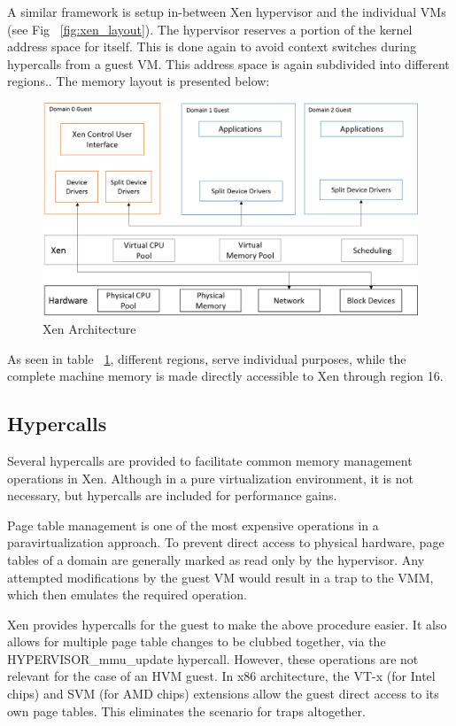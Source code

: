 A similar framework is setup in-between Xen hypervisor and the individual VMs (see Fig ~\ref{fig:xen_layout}). The hypervisor reserves a portion of the kernel address space for itself. This is done again to avoid context switches during hypercalls from a guest VM. This address space is again subdivided into different regions.. The memory layout is presented below: 



\begin{figure}
\centering
\includegraphics[scale=0.6]{figures/Xen_model.png}
\caption{Xen Architecture}
\label{tab:xen_address}
\end{figure}

As seen in table ~\ref{tab:xen_address}, different regions, serve individual purposes, while the complete machine memory is made directly accessible to Xen through region 16. 


\subsection{Hypercalls}
Several hypercalls are provided to facilitate common memory management operations in Xen. Although in a pure virtualization environment, it is not necessary, but hypercalls are included for performance gains.  

 

Page table management is one of the most expensive operations in a paravirtualization approach. To prevent direct access to physical hardware, page tables of a domain are generally marked as read only by the hypervisor. Any attempted modifications by the guest VM would result in a trap to the VMM, which then emulates the required operation. 


Xen provides hypercalls for the guest to make the above procedure easier. It also allows for multiple page table changes to be clubbed together, via the HYPERVISOR\_mmu\_update hypercall. However, these operations are not relevant for the case of an HVM guest. In x86 architecture, the VT-x (for Intel chips) and SVM (for AMD chips) extensions allow the guest direct access to its own page tables. This eliminates the scenario for traps altogether.  

